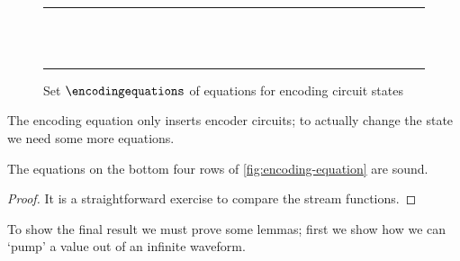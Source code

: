 \documentclass{lmcs}
\begin{document}
\begin{figure}
{{        }{
            \forkuniteqn
        }\)}
    \quad
    \quad
    \\[0.5em]
    \rule{\textwidth}{0.1mm}
    \\[0.75em]
    \quad
    \\[0.25em]
    \rule{\textwidth}{0.1mm}
    \caption{
        Set \(\encodingequations\) of equations for encoding circuit states
    }
    \label{fig:encoding-equation}
\end{figure}

The encoding equation only inserts encoder circuits; to actually change the
state we need some more equations.

\begin{lem}
    The equations on the bottom four rows of \autoref{fig:encoding-equation} are
    sound.
\end{lem}
\begin{proof}
    It is a straightforward exercise to compare the stream functions.
\end{proof}

To show the final result we must prove some lemmas; first we show how we can
`pump' a value out of an infinite waveform.
\end{document}
